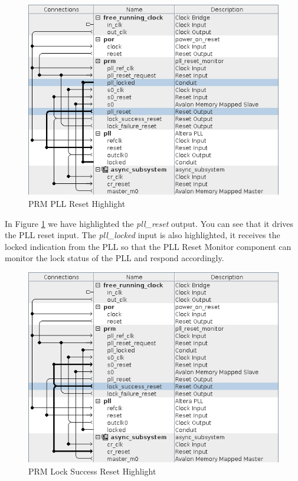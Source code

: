 \documentclass{article}
\begin{document}
\begin{flushleft}
\begin{figure}[H]
\centering
\includegraphics[scale=0.675]{prm_pll_reset}
\caption{PRM PLL Reset Highlight}
\label{fig:prm_pll_reset}
\end{figure}

In Figure \ref{fig:prm_pll_reset} we have highlighted the \emph{pll\_reset} output.  You can see that it drives the PLL reset input.  The \emph{pll\_locked} input is also highlighted, it receives the locked indication from the PLL so that the PLL Reset Monitor component can monitor the lock status of the PLL and respond accordingly.

\begin{figure}[H]
\centering
\includegraphics[scale=0.675]{prm_pll_lock_success_reset}
\caption{PRM Lock Success Reset Highlight}
\label{fig:prm_pll_lock_success_reset}
\end{figure}


\end{flushleft}
\end{document}
